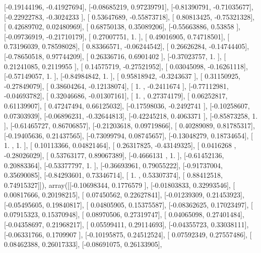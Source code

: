 \documentclass{article}
\begin{document}
       [-0.19144196, -0.41927694],
       [-0.08685219,  0.97239791],
       [-0.81390791, -0.71035677],
       [-0.22922783, -0.3024233 ],
       [ 0.53647689, -0.55873718],
       [ 0.80813425, -0.75321328],
       [ 0.42689702,  0.02480969],
       [ 0.68750138,  0.35089206],
       [-0.55663886,  0.53858   ],
       [-0.09736919, -0.21710179],
       [ 0.27007751,  1.        ],
       [ 0.49016905,  0.74718501],
       [ 0.73196039,  0.78598028],
       [ 0.83366571, -0.06244542],
       [ 0.26626284, -0.14744405],
       [-0.78650518,  0.97744209],
       [ 0.26336716,  0.6901402 ],
       [-0.37023757,  1.        ],
       [ 0.21241085,  0.2119955 ],
       [ 0.14575719, -0.27521952],
       [ 0.03045098, -0.16261118],
       [-0.57149057,  1.        ],
       [-0.84984842,  1.        ],
       [ 0.95818942, -0.3243637 ],
       [ 0.31150925, -0.27849079],
       [ 0.38604264, -0.12138074],
       [ 1.        , -0.2411674 ],
       [-0.77112981, -0.04693782],
       [ 0.32046686, -0.01307161],
       [ 1.        ,  0.27374179],
       [ 0.06252817,  0.61139907],
       [ 0.47247494,  0.66125032],
       [-0.17598036, -0.2492741 ],
       [-0.10258607,  0.07303939],
       [-0.06896231, -0.32644813],
       [-0.42245218,  0.4063371 ],
       [-0.85873258,  1.        ],
       [-0.61465727,  0.86706857],
       [-0.21203618,  0.09719866],
       [ 0.40289089,  0.81785317],
       [-0.19405636,  0.21437565],
       [-0.73099794,  0.08745657],
       [-0.13048279,  0.18734654],
       [ 1.        ,  1.        ],
       [ 0.10113366,  0.04821464],
       [ 0.26317825, -0.43149325],
       [ 0.0416268 , -0.28026029],
       [ 0.53763177,  0.89067389],
       [-0.4666131 ,  1.        ],
       [-0.61452136,  0.20883364],
       [-0.53377797,  1.        ],
       [-0.36693961,  0.79055222],
       [-0.91737004,  0.35690085],
       [-0.84293601,  0.73346714],
       [ 1.        ,  0.53307374],
       [ 0.88412518,  0.74915327]]), array([[-0.10698344,  0.1776579 ],
       [-0.01803833,  0.32993546],
       [ 0.00817666,  0.20198215],
       [ 0.07450562,  0.22627841],
       [-0.01239309,  0.21453923],
       [-0.05495605,  0.19840817],
       [ 0.04805905,  0.15375587],
       [-0.08362625,  0.17023497],
       [ 0.07915323,  0.15370948],
       [ 0.08970506,  0.27319747],
       [ 0.04065098,  0.27401484],
       [-0.04358697,  0.21968217],
       [ 0.05599411,  0.29114693],
       [-0.04355723,  0.33038111],
       [-0.06331766,  0.1709907 ],
       [-0.10195875,  0.24512524],
       [ 0.07592349,  0.27557486],
       [ 0.08462388,  0.26017333],
       [-0.08691075,  0.26133905],
\end{document}
